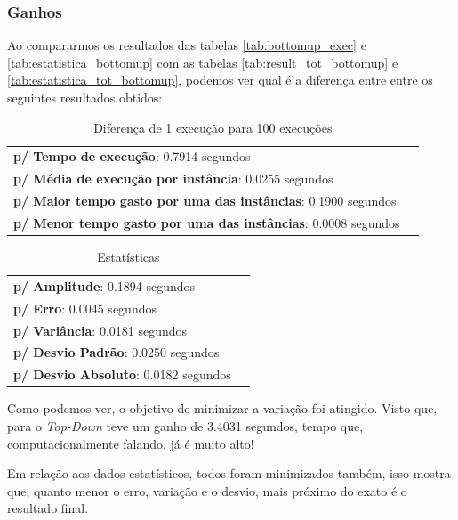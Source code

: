 \documentclass[a4paper, 12pt]{article}
\begin{document}
\subsubsection{Ganhos}

Ao compararmos os resultados das tabelas \ref{tab:bottomup_exec} e \ref{tab:estatistica_bottomup} com as 
tabelas \ref{tab:result_tot_bottomup} e \ref{tab:estatistica_tot_bottomup}, podemos ver qual é a diferença entre 
entre os seguintes resultados obtidos:
\begin{table}[!htb]
    \begin{tabular}{ll}
        {\bf p/ Tempo de execução}: 0.7914 segundos\\
        {\bf p/ Média de execução por instância}: 0.0255 segundos\\
        {\bf p/ Maior tempo gasto por uma das instâncias}: 0.1900 segundos\\
        {\bf p/ Menor tempo gasto por uma das instâncias}: 0.0008 segundos \\
    \end{tabular}
    \caption{Diferença de 1 execução para 100 execuções}
    \label{tab:diff_bottomup}
\end{table}


\begin{table}[!htb]
    \begin{tabular}{ll}
        {\bf p/ Amplitude}: 0.1894 segundos\\
        {\bf p/ Erro}: 0.0045 segundos\\
        {\bf p/ Variância}: 0.0181 segundos\\
        {\bf p/ Desvio Padrão}: 0.0250 segundos\\
        {\bf p/ Desvio Absoluto}: 0.0182 segundos
    \end{tabular}
    \caption{Estatísticas}
    \label{tab:diff_estatistica_bottomup}
\end{table}

\noindent
Como podemos ver, o objetivo de minimizar a variação foi atingido. Visto que, para o {\it Top-Down} teve um
ganho de 3.4031 segundos, tempo que, computacionalmente falando, já é muito alto!

Em relação aos dados estatísticos, todos foram minimizados também, isso mostra que, quanto menor o erro, variação e 
o desvio, mais próximo do exato é o resultado final.

\newpage
\end{document}
